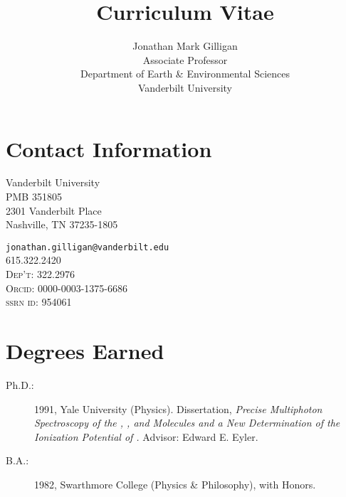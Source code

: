 \documentclass[10pt]{article}
\title{Curriculum Vitae}
\date{\thedate}
\author{Jonathan Mark Gilligan\\
\normalsize Associate Professor\\
Department of Earth \& Environmental Sciences\\
Vanderbilt University}
\begin{document}
\maketitle
\tableofcontents

\clearpage
\section{Contact Information}
\noindent
\parbox[t]{0.45\textwidth}{%
Vanderbilt University\\
PMB 351805\\
2301 Vanderbilt Place\\
Nashville, TN 37235-1805
}
\parbox[t]{0.5\textwidth}{\raggedleft
{\small
    \nolinkurl{jonathan.gilligan@vanderbilt.edu}}\\
    615.322.2420\\
    \textsc{Dep't:} 322.2976\\
    \textsc{Orcid:} 0000-0003-1375-6686\\
    \textsc{ssrn id:} 954061\\
    \qquad{}
}


\section{Degrees Earned}
\begin{description}
\item[Ph.D.:] 1991, Yale University (Physics). Dissertation, \emph{Precise Multiphoton Spectroscopy of the , , and  Molecules and a New Determination of the Ionization Potential of .} Advisor: Edward E. Eyler.
\item[B.A.:] 1982, Swarthmore College (Physics \& Philosophy), with Honors.
\end{description}
\end{document}
